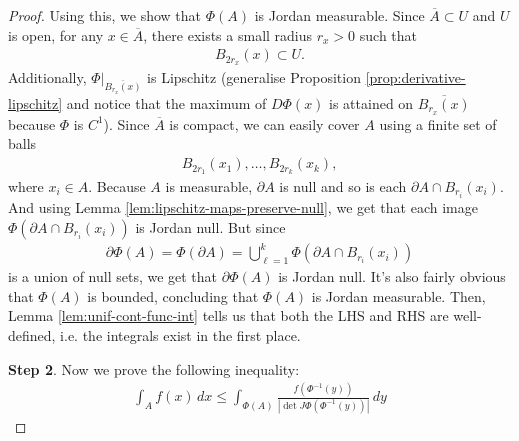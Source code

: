 \begin{proof}
	Using this, we show that $\Phi(A)$ is Jordan measurable. Since $\overline{ A } \subset U$ and $U$ is open, for any $x \in \overline{ A } $, there exists a small radius $r_{x} > 0$ such that
	\begin{align*}
		B_{2r_{x}}(x) \subset U.
	\end{align*}
	Additionally, $\Phi |_{\overline{ B_{r_{x}}(x) } }$ is Lipschitz (generalise Proposition \ref{prop:derivative-lipschitz} and notice that the maximum of $D \Phi(x)$ is attained on $\overline{ B_{r_{x}}(x) } $ because $\Phi$ is $C^{1}$). Since $\overline{ A } $ is compact, we can easily cover $A$ using a finite set of balls
	\begin{align*}
		B_{2r_{1}}(x_{1}), \dots, B_{2r_{k}}(x_{k}),
	\end{align*}
	where $x_{i} \in A$. Because $A$ is measurable, $\partial A$ is null and so is each $\partial A \cap B_{r_{i}}(x_{i})$. And using Lemma \ref{lem:lipschitz-maps-preserve-null}, we get that each image $\Phi( \partial A \cap B_{r_{i}}(x_{i}))$ is Jordan null. But since
	\begin{align*}
		\partial \Phi(A) = \Phi(\partial A) = \bigcup_{\ell = 1}^{k} \Phi( \partial A \cap B_{r_{i}}(x_{i}))
	\end{align*}
	is a union of null sets, we get that $\partial \Phi(A)$ is Jordan null. It's also fairly obvious that $\Phi(A)$ is bounded, concluding that $\Phi(A)$ is Jordan measurable. Then, Lemma \ref{lem:unif-cont-func-int} tells us that both the LHS and RHS are well-defined, i.e. the integrals exist in the first place.

	\textbf{Step 2}. Now we prove the following inequality:
	\begin{align*}
		\int_{A} f(x) \, dx \leq \int_{\Phi(A)} \frac{f(\Phi^{-1}(y))}{\left| \det J \Phi(\Phi^{-1}(y)) \right|} \, dy
	\end{align*}


\end{proof}
